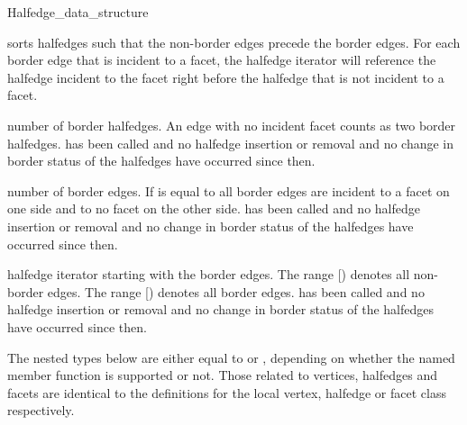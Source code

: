 \begin{ccClass}{Halfedge_data_structure}
\begin{ccAdvanced}

    {sorts halfedges such that the non-border edges precede the
     border edges. For each border edge that is incident to a facet,
     the halfedge iterator will reference the halfedge incident to the
     facet right before the halfedge that is not incident to a facet.}

    {number of border halfedges. An edge with no incident facet
      counts as two border halfedges.
    \ccPrecond {} has been called and no
    halfedge insertion or removal and no change in border
    status of the halfedges have occurred since then.}

    {number of border edges. If  is equal
    to  all border edges are incident to
    a facet on one side and to no facet on the other side.
    \ccPrecond {} has been called and no
    halfedge insertion or removal and no change in border
    status of the halfedges have occurred since then.}

    {halfedge iterator starting with the border edges. The range
      [) denotes
    all non-border edges. The range
    [) denotes all
    border edges.
    \ccPrecond {} has been called and no
    halfedge insertion or removal and no change in border
    status of the halfedges have occurred since then.}
\vspace*{-4mm}
\end{ccAdvanced}


\begin{ccAdvanced}

The nested types below are either equal to  or
, depending on whether the named member function is
supported or not. Those related to vertices, halfedges and facets are
identical to the definitions for the local vertex, halfedge or facet
class respectively.

\ccGlue
{}
\ccGlue
{}
\ccGlue
{}
\ccGlue
{}
\ccGlue
{}


\end{ccAdvanced}
\end{ccClass}
